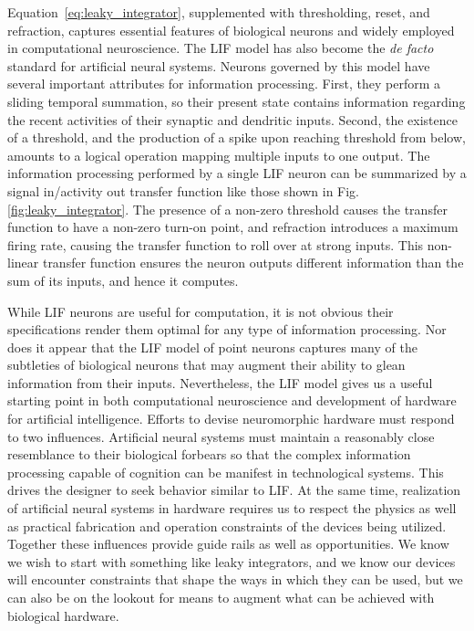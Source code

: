 \documentclass[twocolumn]{article}
\begin{document}
Equation \,\ref{eq:leaky_integrator}, supplemented with thresholding, reset, and refraction, captures essential features of biological neurons and widely employed in computational neuroscience. The LIF model has also become the \textit{de facto} standard for artificial neural systems. Neurons governed by this model have several important attributes for information processing. First, they perform a sliding temporal summation, so their present state contains information regarding the recent activities of their synaptic and dendritic inputs. Second, the existence of a threshold, and the production of a spike upon reaching threshold from below, amounts to a logical operation mapping multiple inputs to one output. The information processing performed by a single LIF neuron can be summarized by a signal in/activity out transfer function like those shown in Fig.\,\ref{fig:leaky_integrator}. The presence of a non-zero threshold causes the transfer function to have a non-zero turn-on point, and refraction introduces a maximum firing rate, causing the transfer function to roll over at strong inputs. This non-linear transfer function ensures the neuron outputs different information than the sum of its inputs, and hence it computes.

While LIF neurons are useful for computation, it is not obvious their specifications render them optimal for any type of information processing. Nor does it appear that the LIF model of point neurons captures many of the subtleties of biological neurons that may augment their ability to glean information from their inputs. Nevertheless, the LIF model gives us a useful starting point in both computational neuroscience and development of hardware for artificial intelligence. Efforts to devise neuromorphic hardware must respond to two influences. Artificial neural systems must maintain a reasonably close resemblance to their biological forbears so that the complex information processing capable of cognition can be manifest in technological systems. This drives the designer to seek behavior similar to LIF. At the same time, realization of artificial neural systems in hardware requires us to respect the physics as well as practical fabrication and operation constraints of the devices being utilized. Together these influences provide guide rails as well as opportunities. We know we wish to start with something like leaky integrators, and we know our devices will encounter constraints that shape the ways in which they can be used, but we can also be on the lookout for means to augment what can be achieved with biological hardware.
\end{document}
